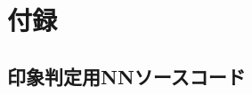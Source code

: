 \documentclass[a4paper,11pt,dvipdfmx]{jreport}
\begin{document}
\newpage

\chapter*{付録}
\section*{印象判定用NNソースコード}
\begin{lstlisting}[caption=印象判定用NN{,} DenseNetに関するソースコード, label=source]
  
\end{lstlisting}
\newpage
{}
\renewcommand{\bibname}{参考文献}

%
%
\end{document}
